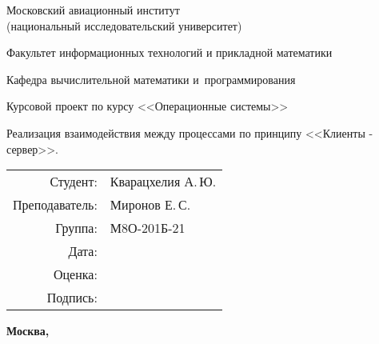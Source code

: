 \begin{titlepage}
	\begin{center}
		\bfseries
		
		{\Large Московский авиационный институт\\ (национальный исследовательский университет)}
		
		\vspace{48pt}
		
		{\large Факультет информационных технологий и прикладной математики}
		
		\vspace{36pt}
		
		{\large Кафедра вычислительной математики и~программирования}
		
		\vspace{48pt}
		
		Курсовой проект по курсу <<Операционные системы>>
		
		\vspace{48pt}
		
		Реализация взаимодействия между процессами по принципу <<Клиенты - сервер>>.
		
	\end{center}
	
	\vspace{150pt}
	
	\begin{flushright}
		\begin{tabular}{rl}
			Студент: & Кварацхелия А.\,Ю. \\
			Преподаватель: & Миронов Е.\,С. \\
			Группа: & М8О-201Б-21 \\
			Дата: & \\
			Оценка: & \\
			Подпись: & \\
		\end{tabular}
	\end{flushright}
	
	\vfill
	
	\begin{center}
		\bfseries
		Москва, \the\year
	\end{center}
\end{titlepage}